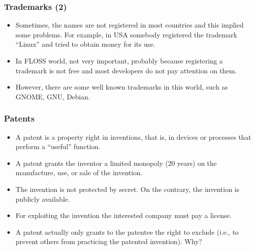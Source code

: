 \documentclass{beamer}
\begin{document}

\begin{frame}
\frametitle{Trademarks (2)}

\begin{itemize}
\item Sometimes, the names are not registered in most countries and this
implied some problems. {\small For example, in USA somebody registered the
trademark ``Linux'' and tried to obtain money for its use.}
\item In FLOSS world, not very important, probably because
registering a trademark is not free and most developers do not pay
attention on them. 
\item However, there are some well known trademarks in
this world, such as GNOME, GNU, Debian.
\end{itemize}

\end{frame}




\begin{frame}
\frametitle{Patents}

\begin{itemize}
\item A patent is a property right in \alert{inventions}, that is, in devices or
processes that perform a ``useful'' function.
\item A patent grants the inventor a limited \alert{monopoly} (20 years) on the
manufacture, use, or sale of the invention. 
\item The invention is not protected by secret. On the contrary, the
  invention is publicly available.
\item For exploiting the invention the interested company must pay a license.
\item A patent actually only grants to the patentee the right \alert{to exclude} (i.e., to prevent others from practicing the patented invention). Why?
\end{itemize}

\end{frame}

\end{document}
